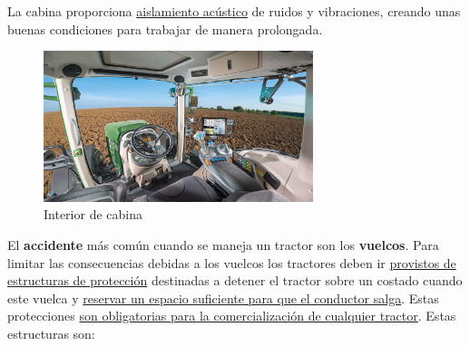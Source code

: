 \documentclass[a4paper,12pt,oneside]{book}
\begin{document}
La cabina proporciona \uline{aislamiento acústico} de ruidos y vibraciones, creando
unas buenas condiciones para trabajar de manera prolongada.

   \begin{figure}[htbp]
\centering
\includegraphics[width=0.7\textwidth]{./img_0009/cabina_tractor.jpg}
\caption{Interior de cabina}
\end{figure}
El \textbf{accidente} más común cuando se maneja un tractor son los \textbf{vuelcos}. Para
limitar las consecuencias debidas a los vuelcos los tractores deben ir
\uline{provistos de estructuras de protección} destinadas a detener el tractor sobre
un costado cuando este vuelca y \uline{reservar un espacio suficiente para que el 
conductor salga}. Estas protecciones \uline{son obligatorias para la comercialización 
de cualquier tractor}.
\newpage
Estas estructuras son:
\end{document}
